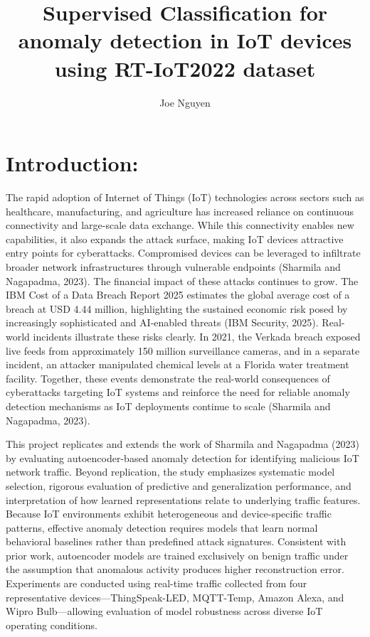 \documentclass[
  8pt,
  letterpaper,
  DIV=11,
  numbers=noendperiod]{scrreprt}
\title{Supervised Classification for anomaly detection in IoT devices
using RT-IoT2022 dataset}
\author{Joe Nguyen}
\date{}
\renewcommand*\contentsname{Table of contents}
\newcommand\contentsname{Table of contents}
\begin{document}
\maketitle

\renewcommand*\contentsname{Table of contents}
{
\hypersetup{linkcolor=}
\setcounter{tocdepth}{2}
\tableofcontents
}


\chapter{Introduction:}\label{introduction}

The rapid adoption of Internet of Things (IoT) technologies across
sectors such as healthcare, manufacturing, and agriculture has increased
reliance on continuous connectivity and large-scale data exchange. While
this connectivity enables new capabilities, it also expands the attack
surface, making IoT devices attractive entry points for cyberattacks.
Compromised devices can be leveraged to infiltrate broader network
infrastructures through vulnerable endpoints (Sharmila and Nagapadma,
2023). The financial impact of these attacks continues to grow. The IBM
Cost of a Data Breach Report 2025 estimates the global average cost of a
breach at USD 4.44 million, highlighting the sustained economic risk
posed by increasingly sophisticated and AI-enabled threats (IBM
Security, 2025). Real-world incidents illustrate these risks clearly. In
2021, the Verkada breach exposed live feeds from approximately 150
million surveillance cameras, and in a separate incident, an attacker
manipulated chemical levels at a Florida water treatment facility.
Together, these events demonstrate the real-world consequences of
cyberattacks targeting IoT systems and reinforce the need for reliable
anomaly detection mechanisms as IoT deployments continue to scale
(Sharmila and Nagapadma, 2023).

This project replicates and extends the work of Sharmila and Nagapadma
(2023) by evaluating autoencoder-based anomaly detection for identifying
malicious IoT network traffic. Beyond replication, the study emphasizes
systematic model selection, rigorous evaluation of predictive and
generalization performance, and interpretation of how learned
representations relate to underlying traffic features. Because IoT
environments exhibit heterogeneous and device-specific traffic patterns,
effective anomaly detection requires models that learn normal behavioral
baselines rather than predefined attack signatures. Consistent with
prior work, autoencoder models are trained exclusively on benign traffic
under the assumption that anomalous activity produces higher
reconstruction error. Experiments are conducted using real-time traffic
collected from four representative devices---ThingSpeak-LED, MQTT-Temp,
Amazon Alexa, and Wipro Bulb---allowing evaluation of model robustness
across diverse IoT operating conditions.
\end{document}
